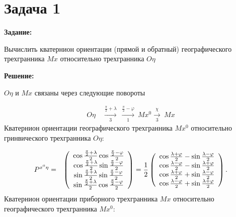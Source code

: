 \documentclass[a4paper,14pt]{article}
\theoremstyle{plain} %
\theoremstyle{definition} %
\theoremstyle{remark} %
\begin{document}
\thispagestyle{empty} %
\normalsize{
\newpage
\tableofcontents
\newpage

\section{Задача 1}
\textbf{Задание:}

Вычислить кватернион ориентации (прямой и обратный) географического трехгранника $Mx$ относительно трехгранника $O\eta$

\textbf{Решение:}

$O\eta$ и $Mx$ связаны через следующие повороты


\begin{eqnarray*}
    O\eta \quad
    \xrightarrow[3]{\frac{\pi}{2} +\lambda}\
    \xrightarrow[1]{\frac{\pi}{2} -\varphi}\
    Mx^0
    \xrightarrow[3]{\chi}\
    Mx
\end{eqnarray*}
Кватернион ориентации географического трехгранника $Mx^0$ относительно гринвического трехгранника $O\eta$:

\begin{eqnarray*}
    P^{x^0\eta} &=&
    \left(
    \begin{array}{c}
            \cos\frac{\frac{\pi}{2}+\lambda}{2}\cos \frac{\frac{\pi}{2}-\varphi}{2}\cr
            \cos\frac{\frac{\pi}{2}+\lambda}{2}\sin\frac{\frac{\pi}{2}-\varphi}{2}\cr
            \sin\frac{\frac{\pi}{2}+\lambda}{2}\sin \frac{\frac{\pi}{2}-\varphi}{2}\cr
            \sin\frac{\frac{\pi}{2}+\lambda}{2}\cos \frac{\frac{\pi}{2}-\varphi}{2}
        \end{array}
    \right)=
    \frac{1}{2}
    \left(
    \begin{array}{c}
            \cos\frac{\lambda+\varphi}{2}- \sin\frac{\lambda-\varphi}{2}\cr
            \cos\frac{\lambda-\varphi}{2}- \sin\frac{\lambda+\varphi}{2}\cr
            \cos\frac{\lambda+\varphi}{2}+ \sin\frac{\lambda-\varphi}{2}\cr
            \cos\frac{\lambda-\varphi}{2}+ \sin\frac{\lambda+\varphi}{2}
        \end{array}
    \right).
\end{eqnarray*}
Кватернион ориентации приборного трехгранника $Mx$ относительно географического трехгранника $Mx^0$:

}
\end{document}
